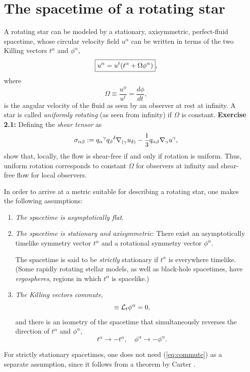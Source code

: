 \documentclass[12pt]{article}
\def\d{\delta}
\def\a{\alpha}
\def\b{\beta}
\def\g{\gamma}
\def\be{\begin{equation}}
\def\ee{\end{equation}}
\newcommand{\na}{\nabla}
\def\a{\alpha}
\def\b{\beta}
\def\d{\delta}
\begin{document}
\section{The spacetime of a rotating star}
\label{sec:spacerot}

A rotating star can be modeled by a stationary, axisymmetric,
perfect-fluid spacetime, whose circular velocity field $u^\alpha$ can be
written in terms of the two Killing vectors $t^\alpha$ and
$\phi^\alpha$,
\begin{equation}
     \boxed{u^\alpha = u^t (t^\alpha + \Omega \phi^\alpha)},
\label{fourvel}\index{velocity!rotating star}\index{rotating stars!velocity}
\end{equation}
where  
\be 
\boxed{\Omega\equiv \frac{u^\phi}{u^t}= \frac{d\phi}{dt}},
\label{eq:Omega} \ee 
is the angular velocity of the fluid as seen by an observer at
rest at infinity.  A star is  called {\it
uniformly rotating} (as seen from infinity) if $\Omega$ is constant.  
\vskip0.5cm
\textbf{Exercise 2.1:} Defining the \textit{shear tensor} as 
\be
\displaystyle
\sigma_{\alpha\beta} := q_\a{}^\g q_\b{}^\d \na_{(\g}u_{\d)}-\frac13 q_{\a\b}\na_\g u^\g, 
\label{eq:shear}\index{shear|textbf}\ee 
show that, locally, the flow is shear-free if and only if rotation
is uniform.
Thus, uniform rotation corresponds to constant $\Omega$ for observers at infinity and shear-free flow for local observers. 

\vskip0.8cm

In order to arrive at a metric suitable for describing a rotating star, one makes the following assumptions:
\begin{enumerate}
\item
\textit{The spacetime is asymptotically flat}.
\item \textit{The spacetime is stationary and axisymmetric}:
There exist an asymptotically timelike symmetry vector $t^\alpha$
and a rotational symmetry vector $\phi^\alpha$.

The spacetime is
said to be {\it strictly} stationary if $t^\alpha$ is everywhere
timelike. (Some rapidly rotating stellar models, as well as
black-hole spacetimes, have {\it ergospheres}, regions in which
$t^\alpha$ is spacelike.)

\item  \textit{The Killing vectors commute}, 
\be
        [t, \phi]\equiv {\cal L}_t \phi^\alpha =0,
\label{eq:commute}\ee
and there is an isometry of the spacetime that simultaneously
reverses the direction of $t^\alpha$ and $\phi^\alpha$,
\be
 t^\alpha\rightarrow -t^\alpha,\quad \phi^\alpha \rightarrow - \phi^\alpha.
\label{eq:isometry} \ee
%
\end{enumerate}
%
For strictly stationary spacetimes, one does not need
(\ref{eq:commute}) as a separate assumption, since it  follows from a theorem by
Carter \cite{Carter70}.
\end{document}
